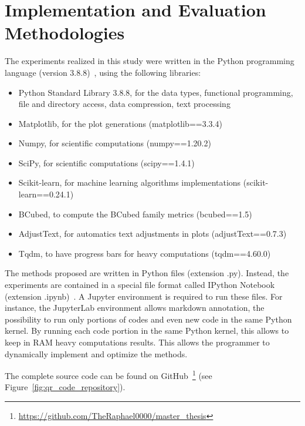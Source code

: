 \section{Implementation and Evaluation Methodologies}

The experiments realized in this study were written in the Python programming language (version 3.8.8)~\cite{python}, using the following libraries:

\begin{itemize}
  \item Python Standard Library 3.8.8, for the data types, functional programming, file and directory access, data compression, text processing~\cite{python_standard_library}
  \item Matplotlib, for the plot generations (matplotlib==3.3.4)~\cite{matplotlib}
  \item Numpy, for scientific computations (numpy==1.20.2)~\cite{numpy}
  \item SciPy, for scientific computations (scipy==1.4.1)~\cite{scipy}
  \item Scikit-learn, for machine learning algorithms implementations (scikit-learn==0.24.1)~\cite{sklearn}
  \item BCubed, to compute the BCubed family metrics (bcubed==1.5)~\cite{bcubed_gh}
  \item AdjustText, for automatics text adjustments in plots (adjustText==0.7.3)~\cite{adjustText}
  \item Tqdm, to have progress bars for heavy computations (tqdm==4.60.0)~\cite{tqdm}
\end{itemize}

The methods proposed are written in Python files (extension .py).
Instead, the experiments are contained in a special file format called IPython Notebook (extension .ipynb)~\cite{jupyter}.
A Jupyter environment is required to run these files.
For instance, the JupyterLab environment allows markdown annotation, the possibility to run only portions of codes and even new code in the same Python kernel.
By running each code portion in the same Python kernel, this allows to keep in RAM heavy computations results.
This allows the programmer to dynamically implement and optimize the methods.

The complete source code can be found on GitHub~\footnote{\url{https://github.com/TheRaphael0000/master_thesis}} (see Figure~\ref{fig:qr_code_repository}).


